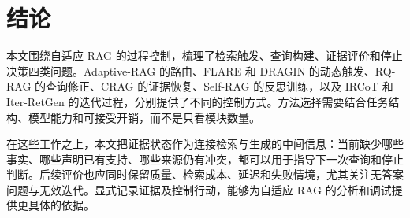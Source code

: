 \section{结论}
\label{sec:conclusion}

本文围绕自适应 RAG 的过程控制，梳理了检索触发、查询构建、证据评价和停止决策四类问题。Adaptive-RAG 的路由、FLARE 和 DRAGIN 的动态触发、RQ-RAG 的查询修正、CRAG 的证据恢复、Self-RAG 的反思训练，以及 IRCoT 和 Iter-RetGen 的迭代过程，分别提供了不同的控制方式。方法选择需要结合任务结构、模型能力和可接受开销，而不是只看模块数量。

在这些工作之上，本文把证据状态作为连接检索与生成的中间信息：当前缺少哪些事实、哪些声明已有支持、哪些来源仍有冲突，都可以用于指导下一次查询和停止判断。后续评价也应同时保留质量、检索成本、延迟和失败情境，尤其关注无答案问题与无效迭代。显式记录证据及控制行动，能够为自适应 RAG 的分析和调试提供更具体的依据。
